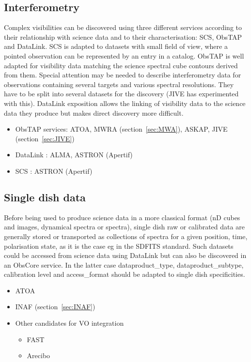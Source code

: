 \documentclass[11pt,a4paper]{ivoa}
\begin{document}
\subsection{Interferometry}
Complex visibilities can be discovered using three different services according to their relationship with science data and to their characterisation: SCS, ObsTAP and DataLink. SCS is adapted to datasets with small field of view, where a pointed observation can be
represented by an entry in a catalog. ObsTAP is well adapted for visibility data matching the science spectral cube contours derived from them. Special attention may be needed to describe interferometry data for observations containing several targets and various spectral resolutions. They have to be split into several datasets for the discovery (JIVE has experimented with this). DataLink exposition allows the linking of visibility data to the science data they produce but makes direct discovery more difficult. 
\begin{itemize}
\item ObsTAP services: ATOA, MWRA (section~\ref{sec:MWA}), ASKAP, JIVE (section~\ref{sec:JIVE})
\item DataLink : ALMA, ASTRON (Apertif)
\item SCS : ASTRON (Apertif)
\end{itemize}
\subsection{Single dish data}
Before being used to produce science data in a more classical format (nD cubes and images, dynamical spectra or spectra),  single dish  raw or calibrated data are generally stored or transported as collections of spectra for a given position, time, polarisation state, as it is the case eg in the SDFITS standard. Such datasets could be accessed from science data using DataLink but can also be discovered in an ObsCore service. In the latter case dataproduct\_type, dataproduct\_subtype, calibration level and access\_format should be adapted to single dish specificities.
\begin{itemize}
\item ATOA 
\item INAF (section~\ref{sec:INAF})
\item Other candidates for VO integration
\begin{itemize}
\item  FAST
\item Arecibo
\end{itemize}
\end{itemize}
\end{document}
